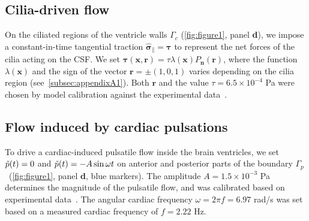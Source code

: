 \documentclass[fleqn]{wlscirep}
\newcommand{\pdifft}[1]{\frac{\partial  #1}{\partial t}}
\newcommand{\Gc}{\Gamma_{c}}
\newcommand{\Gp}{\Gamma_{p}}
\newcommand{\nn}{\mathbf{n}}
\newcommand{\rr}{\mathbf{r}}
\newcommand{\uu}{\mathbf{u}}
\newcommand{\uuref}{\mathbf{u}_{\mathrm{ref}}}
\newcommand{\xx}{\bm{x}}
\newcommand{\bsig}{\bm{\sigma}}
\newcommand{\bsigpar}{\hat{\bsig}_{\parallel}}
\newcommand{\btau}{\bm{\tau}}
\begin{document}
\subsection*{Cilia-driven flow}
On the ciliated regions of the ventricle walls $\Gc$ (\cref{fig:figure1}, panel \textbf{d}), we impose a constant-in-time tangential traction $\bsigpar=\btau$ to represent the net forces of the cilia acting on the CSF. We set $\btau(\xx, \rr) = \tau \lambda(\xx) P_{\nn}(\rr)$, where the function $\lambda(\xx)$ and the sign of the vector $\rr=\pm(1, 0, 1)$ varies depending on the cilia region (see~\cref{subsec:appendixA1}). Both $\rr$ and the value $\tau=6.5\times 10^{-4}$ Pa were chosen by model calibration against the experimental data~\cite{Olstad2019CiliaryDevelopment}.

\subsection*{Flow induced by cardiac pulsations}\label{subsec:pressure_bcs}
To drive a cardiac-induced pulsatile flow inside the brain ventricles, we set $\Tilde{p}(t)=0$ and $\Tilde{p}(t)=-A\sin{\omega t}$ on anterior and posterior parts of the boundary $\Gp$~(\cref{fig:figure1}, panel \textbf{d}, blue markers). The amplitude $A=1.5\times 10^{-3}$ Pa determines the magnitude of the pulsatile flow, and was calibrated based on experimental data~\cite{Olstad2019CiliaryDevelopment}. The angular cardiac frequency $\omega=2\pi f=6.97$ rad/s was set based on a measured cardiac frequency of $f=2.22$ Hz.

\end{document}
